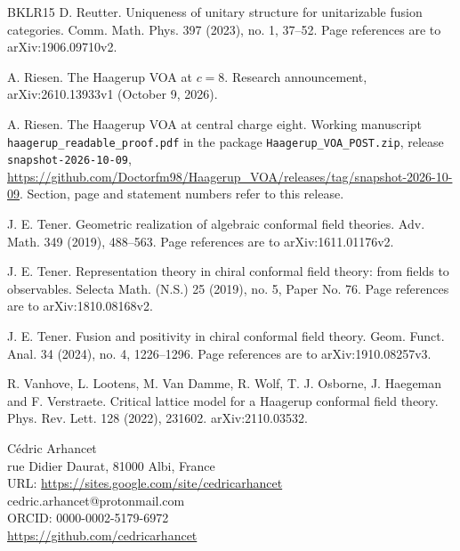 \documentclass[leqno]{article}
\numberwithin{equation}{section}
\begin{document}
\begin{thebibliography}{BKLR15}
D. Reutter.
\newblock Uniqueness of unitary structure for unitarizable fusion categories.
\newblock Comm. Math. Phys. 397 (2023), no. 1, 37--52. Page references are to arXiv:1906.09710v2.

A. Riesen.
\newblock The Haagerup VOA at $c = 8$.
\newblock Research announcement, arXiv:2610.13933v1 (October 9, 2026).

A. Riesen.
\newblock The Haagerup VOA at central charge eight.
\newblock Working manuscript \texttt{haagerup\_readable\_proof.pdf} in the package \texttt{Haagerup\_VOA\_POST.zip}, release \texttt{snapshot-2026-10-09}, \url{https://github.com/Doctorfm98/Haagerup_VOA/releases/tag/snapshot-2026-10-09}. Section, page and statement numbers refer to this release.

J. E. Tener.
\newblock Geometric realization of algebraic conformal field theories.
\newblock Adv. Math. 349 (2019), 488--563. Page references are to arXiv:1611.01176v2.

J. E. Tener.
\newblock Representation theory in chiral conformal field theory: from fields to observables.
\newblock Selecta Math. (N.S.) 25 (2019), no. 5, Paper No. 76. Page references are to arXiv:1810.08168v2.

J. E. Tener.
\newblock Fusion and positivity in chiral conformal field theory.
\newblock Geom. Funct. Anal. 34 (2024), no. 4, 1226--1296. Page references are to arXiv:1910.08257v3.

R. Vanhove, L. Lootens, M. Van Damme, R. Wolf, T. J. Osborne, J. Haegeman and F. Verstraete.
\newblock Critical lattice model for a Haagerup conformal field theory.
\newblock Phys. Rev. Lett. 128 (2022), 231602. arXiv:2110.03532.

\end{thebibliography}

{\footnotesize

\vspace{0.2cm}

\noindent C\'edric Arhancet\\
 rue Didier Daurat, 81000 Albi, France\\
URL: \href{http://sites.google.com/site/cedricarhancet}{https://sites.google.com/site/cedricarhancet}\\
cedric.arhancet@protonmail.com\\
ORCID: 0000-0002-5179-6972\\
\url{https://github.com/cedricarhancet}

}
\end{document}
